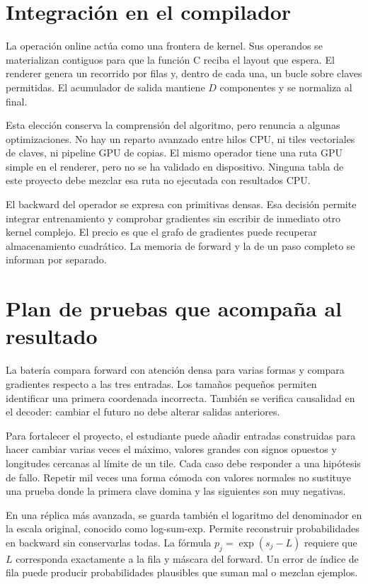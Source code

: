\documentclass[12pt,a4paper,oneside]{report}
\begin{document}
\section{Integración en el compilador}
La operación online actúa como una frontera de kernel. Sus operandos se materializan contiguos para que la función C reciba el layout que espera. El renderer genera un recorrido por filas y, dentro de cada una, un bucle sobre claves permitidas. El acumulador de salida mantiene $D$ componentes y se normaliza al final.

Esta elección conserva la comprensión del algoritmo, pero renuncia a algunas optimizaciones. No hay un reparto avanzado entre hilos CPU, ni tiles vectoriales de claves, ni pipeline GPU de copias. El mismo operador tiene una ruta GPU simple en el renderer, pero no se ha validado en dispositivo. Ninguna tabla de este proyecto debe mezclar esa ruta no ejecutada con resultados CPU.

El backward del operador se expresa con primitivas densas. Esa decisión permite integrar entrenamiento y comprobar gradientes sin escribir de inmediato otro kernel complejo. El precio es que el grafo de gradientes puede recuperar almacenamiento cuadrático. La memoria de forward y la de un paso completo se informan por separado.

\section{Plan de pruebas que acompaña al resultado}
La batería compara forward con atención densa para varias formas y compara gradientes respecto a las tres entradas. Los tamaños pequeños permiten identificar una primera coordenada incorrecta. También se verifica causalidad en el decoder: cambiar el futuro no debe alterar salidas anteriores.

Para fortalecer el proyecto, el estudiante puede añadir entradas construidas para hacer cambiar varias veces el máximo, valores grandes con signos opuestos y longitudes cercanas al límite de un tile. Cada caso debe responder a una hipótesis de fallo. Repetir mil veces una forma cómoda con valores normales no sustituye una prueba donde la primera clave domina y las siguientes son muy negativas.

En una réplica más avanzada, se guarda también el logaritmo del denominador en la escala original, conocido como log-sum-exp. Permite reconstruir probabilidades en backward sin conservarlas todas. La fórmula $p_j=\exp(s_j-L)$ requiere que $L$ corresponda exactamente a la fila y máscara del forward. Un error de índice de fila puede producir probabilidades plausibles que suman mal o mezclan ejemplos.
\end{document}
